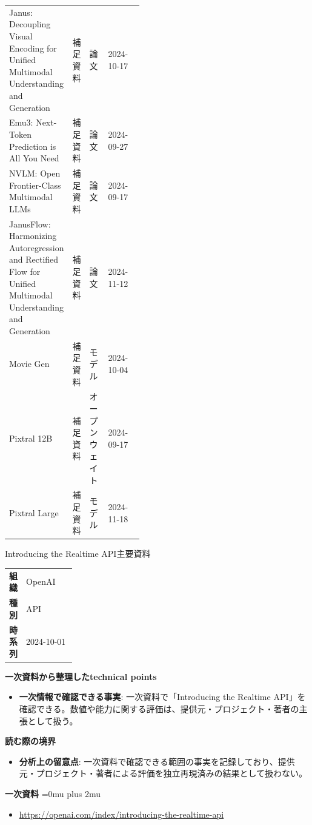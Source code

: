 \begin{center}
\begin{tabularx}{\linewidth}{@{}p{0.20\linewidth}p{0.10\linewidth}p{0.14\linewidth}X@{}}
Janus: Decoupling Visual Encoding for Unified Multimodal Understanding and Generation & 補足資料 & 論文 & 2024-10-17     \\
Emu3: Next-Token Prediction is All You Need & 補足資料 & 論文 & 2024-09-27     \\
NVLM: Open Frontier-Class Multimodal LLMs & 補足資料 & 論文 & 2024-09-17     \\
JanusFlow: Harmonizing Autoregression and Rectified Flow for Unified Multimodal Understanding and Generation & 補足資料 & 論文 & 2024-11-12     \\
Movie Gen & 補足資料 & モデル & 2024-10-04     \\
Pixtral 12B & 補足資料 & オープンウェイト & 2024-09-17     \\
Pixtral Large & 補足資料 & モデル & 2024-11-18     \\
\bottomrule
\end{tabularx}
\end{center}
\normalsize

\begin{technicalnote}{Introducing the Realtime API}{主要資料}
\begingroup
\begin{tabularx}{\linewidth}{@{}>{\bfseries}p{0.22\linewidth}X@{}}
組織 & OpenAI \\
種別 & API \\
時系列 & 2024-10-01 \\
\end{tabularx}
\smallskip
{\bfseries 一次資料から整理したtechnical points}
\begin{itemize}[leftmargin=1.5em,itemsep=0.35em]
\item \textbf{一次情報で確認できる事実}: 一次資料で「Introducing the Realtime API」を確認できる。数値や能力に関する評価は、提供元・プロジェクト・著者の主張として扱う。
\end{itemize}
\begin{minipage}{\linewidth}
{\bfseries 読む際の境界}
\begin{itemize}[leftmargin=1.5em,itemsep=0.35em]
\item \textbf{分析上の留意点}: 一次資料で確認できる範囲の事実を記録しており、提供元・プロジェクト・著者による評価を独立再現済みの結果として扱わない。
\end{itemize}
\begin{samepage}
{\bfseries 一次資料}
\begingroup\sloppy
\Urlmuskip=0mu plus 2mu\relax
\begin{itemize}[leftmargin=1.5em,itemsep=0.25em]
\item {\scriptsize\url{https://openai.com/index/introducing-the-realtime-api}}
\end{itemize}
\endgroup
\end{samepage}
\end{minipage}
\endgroup
\end{technicalnote}
\medskip

